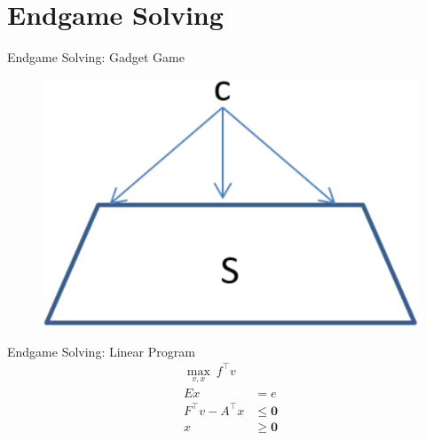 \documentclass{beamer}
\theoremstyle{definition}
\newcommand{\vect}[1]{\boldsymbol{#1}}
\begin{document}
  \section{Endgame Solving}
  {
    \begin{frame}{Endgame Solving: Gadget Game}
      \begin{figure}
        \centering
        \includegraphics[width=.5\textwidth]{../img/endgame-solving-gadget.png}
      \end{figure}
    \end{frame}

    \begin{frame}{Endgame Solving: Linear Program}
      \begin{equation*}
        \label{lp:endgame-solving}
        \begin{split}
          \max_{v, x}\  f^\top v & \\
          Ex &= e \\
          F^\top v - A^\top x &\le \vect{0} \\
          x &\ge \vect{0}
        \end{split}
      \end{equation*}
    \end{frame}
  }
\end{document}
